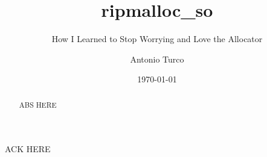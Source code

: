 \documentclass[italian,noexaminfo,oneside,binding=0.6cm]{sapthesis}
\title{ripmalloc\_so}
\subtitle{How I Learned to Stop Worrying and Love the Allocator}
\author{Antonio Turco}
\date{\today}
\begin{document}
\frontmatter  
\maketitle
\dedication{Dedicato a...}

\begin{abstract}
  ABS HERE
\end{abstract}


\mainmatter 
\begin{acknowledgments}
  ACK HERE 
\end{acknowledgments}

\tableofcontents











\backmatter
\end{document}
